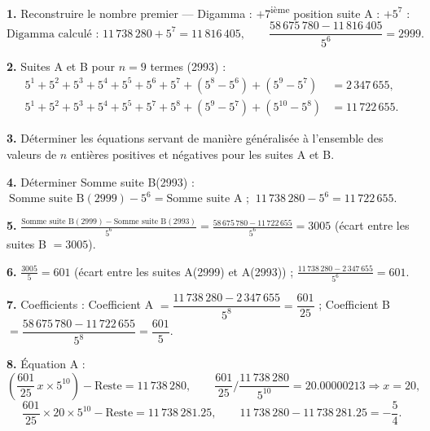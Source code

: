 \documentclass[11pt,a4paper]{article}
\begin{document}
\begin{boitenote}
\begin{boitenote}[Inspiration]
\begin{boitenote}
\textbf{1.} Reconstruire le nombre premier --- Digamma : $+$7\textsuperscript{ième}
position suite A : $+5^{7}$ :
\[
\text{Digamma calculé : } 11\,738\,280 + 5^{7} = 11\,816\,405,
\qquad
\frac{58\,675\,780 - 11\,816\,405}{5^{6}} = 2999.
\]

\textbf{2.} Suites A et B pour $n = 9$ termes (2993) :
\begin{align*}
5^{1}+5^{2}+5^{3}+5^{4}+5^{5}+5^{6}+5^{7}+(5^{8}-5^{6})+(5^{9}-5^{7}) &= 2\,347\,655,\\
5^{1}+5^{2}+5^{3}+5^{4}+5^{5}+5^{7}+5^{8}+(5^{9}-5^{7})+(5^{10}-5^{8}) &= 11\,722\,655.
\end{align*}

\textbf{3.} Déterminer les équations servant de manière généralisée à
l'ensemble des valeurs de $n$ entières positives et négatives pour les suites A
et B.

\textbf{4.} Déterminer Somme suite B(2993) :
$\ \text{Somme suite B}(2999) - 5^{6} = \text{Somme suite A}$ ;
$\ 11\,738\,280 - 5^{6} = 11\,722\,655$.

\textbf{5.} $\displaystyle \frac{\text{Somme suite B}(2999) - \text{Somme suite B}(2993)}{5^{6}}
= \frac{58\,675\,780 - 11\,722\,655}{5^{6}} = 3005$ \quad (écart entre les suites B $= 3005$).

\textbf{6.} $\displaystyle \frac{3005}{5} = 601$ (écart entre les suites A(2999) et A(2993)) ;
$\displaystyle \frac{11\,738\,280 - 2\,347\,655}{5^{6}} = 601$.

\textbf{7.} Coefficients : \quad
Coefficient A $= \dfrac{11\,738\,280 - 2\,347\,655}{5^{8}} = \dfrac{601}{25}$ ;\qquad
Coefficient B $= \dfrac{58\,675\,780 - 11\,722\,655}{5^{8}} = \dfrac{601}{5}$.

\textbf{8.} Équation A :
\[
\left(\frac{601}{25}\, x \times 5^{10}\right) - \text{Reste} = 11\,738\,280,
\qquad
\frac{601}{25}\Big/\frac{11\,738\,280}{5^{10}} = 20.00000213 \Rightarrow x = 20,
\]
\[
\frac{601}{25}\times 20 \times 5^{10} - \text{Reste} = 11\,738\,281.25,
\qquad
11\,738\,280 - 11\,738\,281.25 = -\frac{5}{4}.
\]


\end{boitenote}
\end{boitenote}
\end{boitenote}
\end{document}
